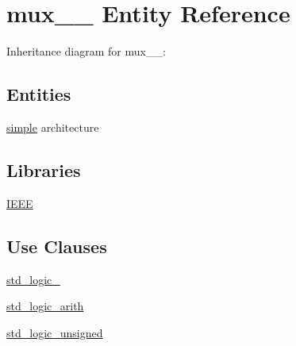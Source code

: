 \hypertarget{classmux__2__1}{}\section{mux\+\_\+\_ Entity Reference}
\label{classmux__2__1}


Inheritance diagram for mux\+\_\+\_\+:
\subsection*{Entities}
\begin{DoxyCompactItemize}
\item 
\hyperlink{classmux__2__1_1_1simple}{simple} architecture
\end{DoxyCompactItemize}
\subsection*{Libraries}
 \begin{DoxyCompactItemize}
\item 
\hyperlink{classmux__2__1_ae4f03c286607f3181e16b9aa12d0c6d4}{I\+E\+E\+E} 
\end{DoxyCompactItemize}
\subsection*{Use Clauses}
 \begin{DoxyCompactItemize}
\item 
\hyperlink{classmux__2__1_acd03516902501cd1c7296a98e22c6fcb}{std\+\_\+logic\+\_}   
\item 
\hyperlink{classmux__2__1_a0f5ecc6613f63d07f7963a97b1b26095}{std\+\_\+logic\+\_\+arith}   
\item 
\hyperlink{classmux__2__1_a598da929e807d58939b47499e8bc9fa8}{std\+\_\+logic\+\_\+unsigned}   
\end{DoxyCompactItemize}
